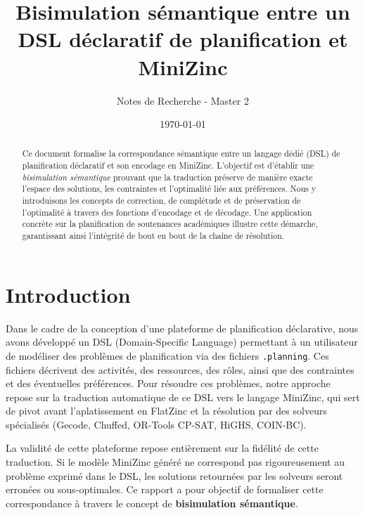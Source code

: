 \documentclass[12pt,a4paper]{article}
\title{Bisimulation sémantique entre un DSL déclaratif de planification et MiniZinc}
\author{Notes de Recherche - Master 2}
\date{\today}
\begin{document}
\maketitle

\begin{abstract}
Ce document formalise la correspondance sémantique entre un langage dédié (DSL) de planification déclaratif et son encodage en MiniZinc. L'objectif est d'établir une \textit{bisimulation sémantique} prouvant que la traduction préserve de manière exacte l'espace des solutions, les contraintes et l'optimalité liée aux préférences. Nous y introduisons les concepts de correction, de complétude et de préservation de l'optimalité à travers des fonctions d'encodage et de décodage. Une application concrète sur la planification de soutenances académiques illustre cette démarche, garantissant ainsi l'intégrité de bout en bout de la chaîne de résolution.
\end{abstract}

\tableofcontents
\newpage

\section{Introduction}
Dans le cadre de la conception d'une plateforme de planification déclarative, nous avons développé un DSL (Domain-Specific Language) permettant à un utilisateur de modéliser des problèmes de planification via des fichiers \texttt{.planning}. Ces fichiers décrivent des activités, des ressources, des rôles, ainsi que des contraintes et des éventuelles préférences. Pour résoudre ces problèmes, notre approche repose sur la traduction automatique de ce DSL vers le langage MiniZinc, qui sert de pivot avant l'aplatissement en FlatZinc et la résolution par des solveurs spécialisés (Gecode, Chuffed, OR-Tools CP-SAT, HiGHS, COIN-BC).

La validité de cette plateforme repose entièrement sur la fidélité de cette traduction. Si le modèle MiniZinc généré ne correspond pas rigoureusement au problème exprimé dans le DSL, les solutions retournées par les solveurs seront erronées ou sous-optimales. Ce rapport a pour objectif de formaliser cette correspondance à travers le concept de \textbf{bisimulation sémantique}.
\end{document}
